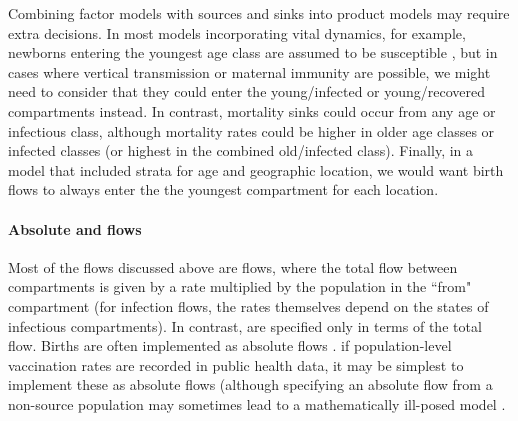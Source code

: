 Combining factor models with sources and sinks into product models may require extra decisions. In most models incorporating vital dynamics, for example, newborns entering the youngest age class are assumed to be susceptible \citep{Earn2008}, but in cases where vertical transmission or maternal immunity are possible, we might need to consider that they could enter the young/infected or young/recovered compartments instead. In contrast, mortality sinks could occur from any age or infectious class, although mortality rates could be higher in older age classes or infected classes (or highest in the combined old/infected class). Finally, in a model that included strata for age and geographic location, we would want birth flows to always enter the the youngest compartment for each location.

\paragraph{Absolute and \pc flows}

Most of the flows discussed above are \pc flows, \ie where the total flow between compartments is given by a \pc rate multiplied by the population in the ``from" compartment
(for infection flows, the \pc rates themselves depend on the states of infectious compartments).
In contrast,  are specified only in terms of the total flow. Births are often implemented as absolute flows \citep{Earn2008}. if population-level vaccination rates are recorded in public health data, it may be simplest to implement these as absolute flows (although specifying an absolute flow from a non-source population may sometimes lead to a mathematically ill-posed model \citep{gharouni2022testing}.



